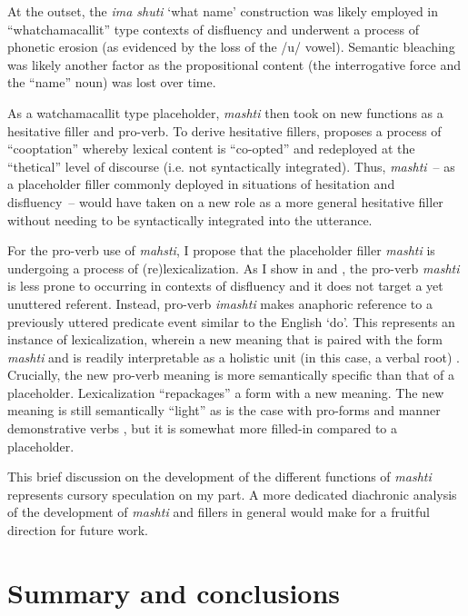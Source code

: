 \documentclass[output=paper]{langscibook}
\begin{document}
At the outset, the \textit{ima shuti} ‘what name’ construction was likely employed in “whatchamacallit” type contexts of disfluency and underwent a process of phonetic erosion (as evidenced by the loss of the /u/ vowel). Semantic bleaching was likely another factor as the propositional content (the interrogative force and the “name” noun) was lost over time. 

As a watchamacallit type placeholder, \textit{mashti} then took on new functions as a hesitative filler and pro-verb. To derive hesitative fillers, \citet{Heine2013} proposes a process of “cooptation” whereby lexical content is “co-opted” and redeployed at the “thetical” level of discourse (i.e. not syntactically integrated). Thus, \textit{mashti}~-- as a placeholder filler commonly deployed in situations of hesitation and disfluency~-- would have taken on a new role as a more general hesitative filler without needing to be syntactically integrated into the utterance.

For the pro-verb use of \textit{mahsti}, I propose that the placeholder filler \textit{mashti} is undergoing a process of (re)lexicalization. As I show in  and , the pro-verb \textit{mashti} is less prone to occurring in contexts of disfluency and it does not target a yet unuttered referent. Instead, pro-verb \textit{imashti} makes anaphoric reference to a previously uttered predicate event similar to the English ‘do’. This represents an instance of lexicalization, wherein a new meaning that is paired with the form \textit{mashti} and is readily interpretable as a holistic unit (in this case, a verbal root) \citep{Lehmann2002}. Crucially, the new pro-verb meaning is more semantically specific than that of a placeholder. Lexicalization “repackages” a form with a new meaning. The new meaning is still semantically “light” as is the case with pro-forms and manner demonstrative verbs \citep{Guérin2015}, but it is somewhat more filled-in compared to a placeholder.

This brief discussion on the development of the different functions of \textit{mashti} represents cursory speculation on my part. A more dedicated diachronic analysis of the development of \textit{mashti} and fillers in general would make for a fruitful direction for future work.

\section{Summary and conclusions}
\label{sec:rice:6}
\end{document}
